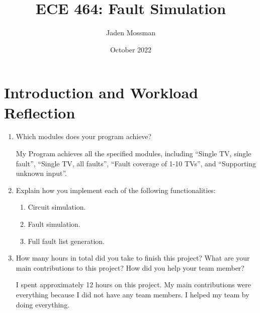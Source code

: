 \documentclass{article}
\title{ECE 464: Fault Simulation}
\author{Jaden Mossman}
\date{October 2022}
\begin{document}
    \maketitle
    \tableofcontents

    \newpage
    \section{Introduction and Workload Reflection}
        \begin{enumerate}[label=\Alph*.]
            \item Which modules does your program achieve?
            
            My Program achieves all the specified modules, including ``Single TV, single fault'', ``Single TV, all faults'', ``Fault coverage of 1-10 TVs'', and ``Supporting unknown input''.
            
            \item Explain how you implement each of the following functionalities:
            \begin{enumerate}[label=\roman*.]
                \item Circuit simulation.
                \item Fault simulation.
                \item Full fault list generation.
            \end{enumerate}
            
            \item How many hours in total did you take to finish this project? What are your main contributions to this project? How did you help your team member?
            
            I spent approximately 12 hours on this project. My main contributions were everything because I did not have any team members. I helped my team by doing everything.
            
        \end{enumerate}
\end{document}
